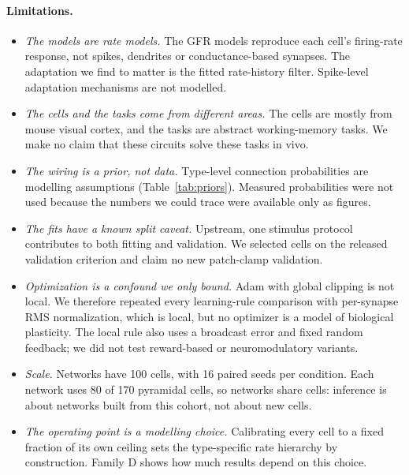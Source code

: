 \paragraph{Limitations.}
\begin{itemize}
\item \emph{The models are rate models.} The GFR models reproduce each cell's firing-rate
response, not spikes, dendrites or conductance-based synapses. The adaptation we find to matter
is the fitted rate-history filter. Spike-level adaptation mechanisms are not modelled.
\item \emph{The cells and the tasks come from different areas.} The cells are mostly from mouse
visual cortex, and the tasks are abstract working-memory tasks. We make no claim that these
circuits solve these tasks in vivo.
\item \emph{The wiring is a prior, not data.} Type-level connection probabilities are modelling
assumptions (Table~\ref{tab:priors}). Measured probabilities were not used because the numbers
we could trace were available only as figures.
\item \emph{The fits have a known split caveat.} Upstream, one stimulus protocol contributes to
both fitting and validation. We selected cells on the released validation criterion and claim no
new patch-clamp validation.
\item \emph{Optimization is a confound we only bound.} Adam with global clipping is not local. We
therefore repeated every learning-rule comparison with per-synapse RMS normalization, which is
local, but no optimizer is a model of biological plasticity. The local rule also uses a
broadcast error and fixed random feedback; we did not test reward-based or neuromodulatory
variants.
\item \emph{Scale.} Networks have 100 cells, with 16 paired seeds per condition. Each network uses
80 of 170 pyramidal cells, so networks share cells: inference is about networks built from this
cohort, not about new cells.
\item \emph{The operating point is a modelling choice.} Calibrating every cell to a fixed fraction
of its own ceiling sets the type-specific rate hierarchy by construction. Family D shows how much
results depend on this choice.
\end{itemize}
